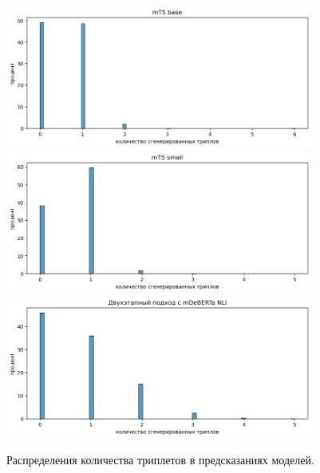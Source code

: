 \begin{figure}[!ht]
    \centering
    \includegraphics[width=0.9\textwidth]{images/mT5_base_preds_distr.png}
    \includegraphics[width=0.9\textwidth]{images/mT5_small_preds_distr.png}
    \includegraphics[width=0.9\textwidth]{images/two_stage_preds_distr.png}
    \caption{Распределения количества триплетов в предсказаниях моделей.}
    \label{fig:preds_distr}
\end{figure}

